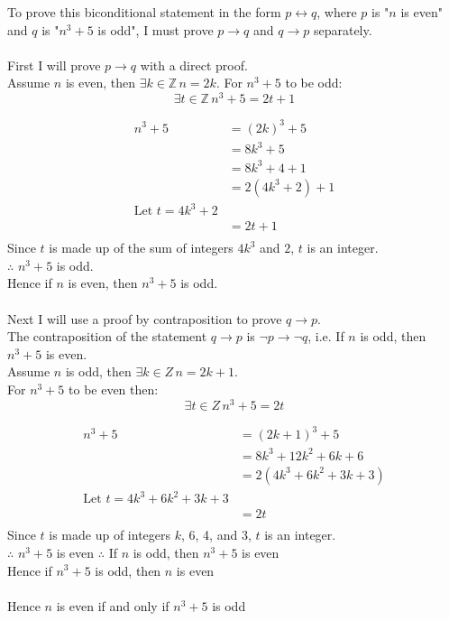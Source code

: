 \documentclass[12pt letter]{report}
\begin{document}

\begin{myproof}
  To prove this biconditional statement in the form $p \leftrightarrow q$, where $p$ is "$n$ is even" and $q$ is "$n^3 +
    5$ is odd", I must prove $p \to q$ and $q \to p$ separately. \\
  \\
  First I will prove $p \to q$ with a direct proof.\\
  Assume $n$ is even, then $\exists k \in \mathbb{Z}\, n = 2k$.
  For $n^3 + 5$ to be odd:
  \[
    \exists t \in \mathbb{Z}\, n^3 + 5 = 2t + 1
  \]

  \begin{align*}
    n^3 + 5 & = \left( 2k \right)^3 + 5       \\
            & = 8k^3 + 5                      \\
            & = 8k^3 + 4 + 1                  \\
            & = 2 \left( 4k^3 + 2 \right) + 1 \\
    \text{Let } t = 4k^3 + 2                  \\
            & = 2t + 1                        \\
  \end{align*}
  Since $t$ is made up of the sum of integers $4k^3$ and $2$, $t$ is an integer.\\
  $\therefore$ $n^3 + 5$ is odd. \\
  Hence if $n$ is even, then $n^3 + 5$ is odd. \\
  \\
  Next I will use a proof by contraposition to prove $q \to p$. \\
  The contraposition of the statement $q \to p$ is $\neg p \to \neg q$, i.e. If $n$ is odd, then $n^3 + 5$ is even.\\
  Assume $n$ is odd, then $\exists k \in Z\, n = 2k + 1$. \\
  For $n^3 + 5$ to be even then:
  \[
    \exists t \in Z\, n^3 + 5 = 2t
  \]

  \begin{align*}
    n^3 + 5 & =  \left( 2k + 1 \right)^3 + 5          \\
            & = 8k^3 + 12k^2 + 6k + 6                 \\
            & = 2 \left( 4k^3 + 6k^2 + 3k + 3 \right) \\
    \text{Let } t = 4k^3 + 6k^2 + 3k + 3              \\
            & = 2t                                    \\
  \end{align*}
  Since $t$ is made up of integers $k$, 6, 4, and 3, $t$ is an integer. \\
  $\therefore$ $n^3 + 5$ is even
  $\therefore$ If $n$ is odd, then $n^3 + 5$ is even \\
  Hence if $n^3+ 5$ is odd, then $n$ is even\\
  \\
  Hence $n$ is even if and only if $n^3 + 5$ is odd


\end{myproof}
\end{document}
